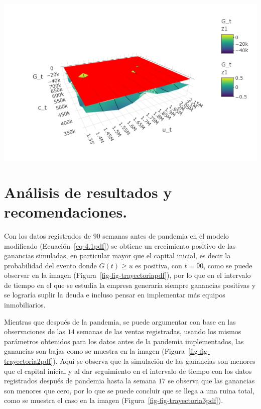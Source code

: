 \documentclass[
  us-letterpaper,
]{scrreprt}
\theoremstyle{definition}
\theoremstyle{plain}
\theoremstyle{plain}
\theoremstyle{remark}
\begin{document}
\begin{center}
\includegraphics[width=6.25in,height=\textheight]{fig-analisis3pdf.png}
\end{center}

\section{Análisis de resultados y
recomendaciones.}\label{anuxe1lisis-de-resultados-y-recomendaciones.}

Con los datos registrados de \(90\) semanas antes de pandemia en el
modelo modificado (Ecuación~\ref{eq-4.1pdf}) se obtiene un crecimiento
positivo de las ganancias simuladas, en particular mayor que el capital
inicial, es decir la probabilidad del evento donde \(G(t)\geq u\) es
positiva, con \(t=90\), como se puede observar en la imagen
(Figura~\ref{fig-fig-trayectoriapdf}), por lo que en el intervalo de
tiempo en el que se estudia la empresa generaría siempre ganancias
positivas y se lograría suplir la deuda e incluso pensar en implementar
más equipos inmobiliarios.

Mientras que después de la pandemia, se puede argumentar con base en las
observaciones de las \(14\) semanas de las ventas registradas, usando
los mismos parámetros obtenidos para los datos antes de la pandemia
implementados, las ganancias son bajas como se muestra en la imagen
(Figura~\ref{fig-fig-trayectoria2pdf}). Aquí se observa que la
simulación de las ganancias son menores que el capital inicial y al dar
seguimiento en el intervalo de tiempo con los datos registrados después
de pandemia hasta la semana \(17\) se observa que las ganancias son
menores que cero, por lo que se puede concluir que se llega a una ruina
total, como se muestra el caso en la imagen
(Figura~\ref{fig-fig-trayectoria3pdf}).
\end{document}
